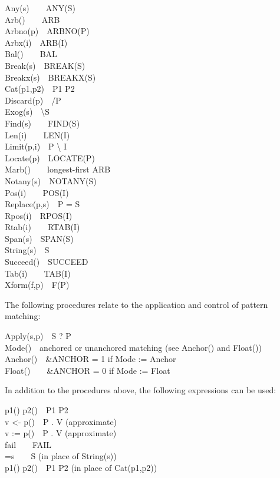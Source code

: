 Any(s)\ \ \ \ ANY(S)\\
Arb()\ \ \ \ ARB\\
Arbno(p)\ \ ARBNO(P)\\
Arbx(i)\ \ ARB(I)\\
Bal()\ \ \ \ BAL\\
Break(s)\ \ BREAK(S)\\
Breakx(s)\ \ BREAKX(S)\\
Cat(p1,p2)\ \ P1 P2\\
Discard(p)\ \ /P\\
Exog(s)\ \ {\textbackslash}S\\
Find(s)\ \ \ \ FIND(S)\\
Len(i)\ \ \ \ LEN(I)\\
Limit(p,i)\ \ P {\textbackslash} I\\
Locate(p)\ \ LOCATE(P)\\
Marb()\ \ \ \ longest-first ARB\\
Notany(s)\ \ NOTANY(S)\\
Pos(i)\ \ \ \ POS(I)\\
Replace(p,s)\ \ P = S\\
Rpos(i)\ \ RPOS(I)\\
Rtab(i)\ \ \ \ RTAB(I)\\
Span(s)\ \ SPAN(S)\\
String(s)\ \ S\\
Succeed()\ \ SUCCEED\\
Tab(i)\ \ \ \ TAB(I)\\
Xform(f,p)\ \ F(P)

The following procedures relate to the application and control of
pattern matching:

Apply(s,p)\ \ S ? P\\
Mode()\ \ anchored or unanchored matching (see Anchor() and
Float())\\
Anchor()\ \ \&ANCHOR = 1 if Mode := Anchor\\
Float()\ \ \ \ \&ANCHOR = 0 if Mode := Float

In addition to the procedures above, the following expressions can be
used:

p1() {\textbar} p2()\ \ P1 {\textbar} P2\\
v {\textless}- p()\ \ P . V (approximate)\\
v := p()\ \ P . V (approximate)\\
fail\ \ \ \ FAIL\\
=s\ \ \ \ S (in place of String(s))\\
p1() {\textbar}{\textbar} p2()\ \ P1 P2 (in place of Cat(p1,p2))

